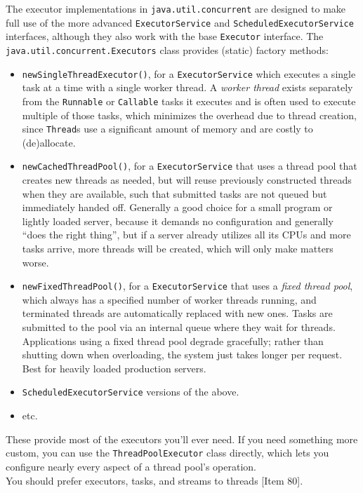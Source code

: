 \documentclass[8pt, table, xcdraw]{article}%
\begin{document}
The executor implementations in \lstinline{java.util.concurrent} are designed to make full use of the more advanced \lstinline{ExecutorService} and \lstinline{ScheduledExecutorService} interfaces, although they also work with the base \lstinline{Executor} interface. The \lstinline{java.util.concurrent.Executors} class provides (static) factory methods:

\begin{itemize}
    \item \lstinline{newSingleThreadExecutor()}, for a \lstinline{ExecutorService} which executes a single task at a time with a single worker thread. A \emph{worker thread} exists separately from the \lstinline{Runnable} or \lstinline{Callable} tasks it executes and is often used to execute multiple of those tasks, which minimizes the overhead due to thread creation, since \lstinline{Thread}s use a significant amount of memory and are costly to (de)allocate.
    \item \lstinline{newCachedThreadPool()}, for a \lstinline{ExecutorService} that uses a thread pool that creates new threads as needed, but will reuse previously constructed threads when they are available, such that submitted tasks are not queued but immediately handed off. Generally a good choice for a small program or lightly loaded server, because it demands no configuration and generally “does the right thing”, but if a server already utilizes all its CPUs and more tasks arrive, more threads will be created, which will only make matters worse.
    \item \lstinline{newFixedThreadPool()}, for a \lstinline{ExecutorService} that uses a \emph{fixed thread pool}, which always has a specified number of worker threads running, and terminated threads are automatically replaced with new ones. Tasks are submitted to the pool via an internal queue where they wait for threads. Applications using a fixed thread pool degrade gracefully; rather than shutting down when overloading, the system just takes longer per request. Best for heavily loaded production servers.
    \item \lstinline{ScheduledExecutorService} versions of the above.
    \item etc.
\end{itemize}

These provide most of the executors you’ll ever need. If you need something more custom, you can use the \lstinline{ThreadPoolExecutor} class directly, which lets you configure nearly every aspect of a thread pool’s operation.\\
You should prefer executors, tasks, and streams to threads [Item 80].
\end{document}
